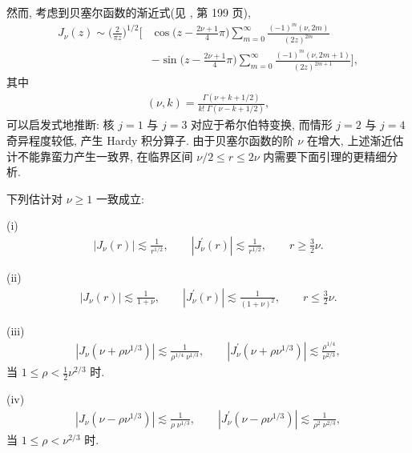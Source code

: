 然而, 考虑到贝塞尔函数的渐近式(见 \cite{b147}, 第 199 页),
\begin{align*}
  J_{\nu}(z)\sim\Big(\frac{2}{\pi z}\Big)^{1/2}\Bigg[&
  \cos\Big(z-\frac{2\nu+1}{4}\pi\Big)\sum_{m=0}^{\infty}\frac{(-1)^{m}(\nu,2m)}{(2z)^{2m}}\\
  &-\sin\Big(z-\frac{2\nu+1}{4}\pi\Big)\sum_{m=0}^{\infty}\frac{(-1)^{m}(\nu,2m+1)}{(2z)^{2m+1}}\Bigg],
\end{align*}
其中
\begin{align*}
  \left(\nu,k\right)=\frac{\Gamma\left(\nu+k+1/2\right)}{k!\;\Gamma\left(\nu-k+1/2\right)},
\end{align*}
可以启发式地推断: 核 $j = 1$ 与 $j = 3$ 对应于希尔伯特变换, 而情形 $j = 2$ 与 $j = 4$ 奇异程度较低, 产生 Hardy 积分算子. 由于贝塞尔函数的阶 $\nu$ 在增大, 上述渐近估计不能靠蛮力产生一致界, 在临界区间 $\nu/2 \leq r \leq 2\nu$ 内需要下面引理的更精细分析.

\begin{lemma}\label{lem:6.3}
下列估计对 $\nu \geq 1$ 一致成立:

(i)
\begin{align*}
  |J_{\nu}(r)|\lesssim\frac{1}{r^{1/2}},\qquad
  |J_{\nu}^{\prime}(r)|\lesssim\frac{1}{r^{1/2}},\qquad r\geq\frac{3}{2}\nu.
\end{align*}

(ii)
\begin{align*}
  |J_{\nu}(r)|\lesssim\frac{1}{1+\nu},\qquad
  |J_{\nu}^{\prime}(r)|\lesssim\frac{1}{(1+\nu)^{2}},\qquad r\leq\frac{3}{2}\nu.
\end{align*}

(iii)
\begin{align*}
  |J_{\nu}(\nu+\rho\nu^{1/3})|\lesssim\frac{1}{\rho^{1/4}\;\nu^{1/3}},\qquad
  |J_{\nu}^{\prime}(\nu+\rho\nu^{1/3})|\lesssim\frac{\rho^{1/4}}{\nu^{2/3}},
\end{align*}
当 $1\leq\rho<\frac{1}{2}\nu^{2/3}$ 时.

(iv)
\begin{align*}
  |J_{\nu}(\nu-\rho\nu^{1/3})|\lesssim\frac{1}{\rho\;\nu^{1/3}},\qquad
  |J_{\nu}^{\prime}(\nu-\rho\nu^{1/3})|\lesssim\frac{1}{\rho^{2}\;\nu^{2/3}},
\end{align*}
当 $1\leq\rho<\nu^{2/3}$ 时.
\end{lemma}

